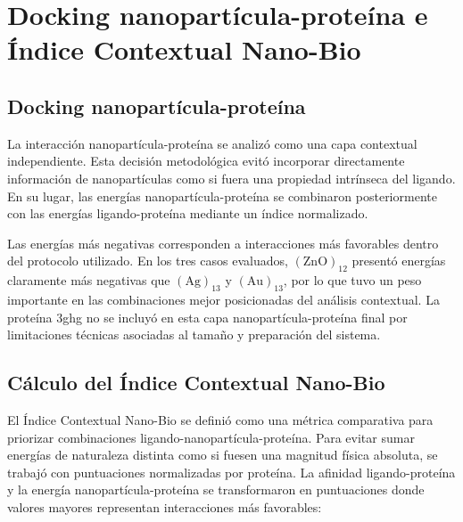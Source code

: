 \documentclass[
  spanish,
  a4paper,
  12pt,
  oneside,
  openany]{memoir}
\newcommand{\apendice}[1]{\chapter{#1}}
\begin{document}
\apendice{Docking nanopartícula-proteína e Índice Contextual Nano-Bio}

\section{Docking nanopartícula-proteína}

La interacción nanopartícula-proteína se analizó como una capa
contextual independiente. Esta decisión metodológica evitó incorporar
directamente información de nanopartículas como si fuera una propiedad
intrínseca del ligando. En su lugar, las energías nanopartícula-proteína
se combinaron posteriormente con las energías ligando-proteína mediante
un índice normalizado.

\begin{table}

\caption{\label{tbl-anexo-nano-proteina-icnb}Energías de docking nanopartícula-proteína utilizadas en la capa contextual.}


\end{table}%

Las energías más negativas corresponden a interacciones más favorables
dentro del protocolo utilizado. En los tres casos evaluados,
\((\mathrm{ZnO})_{12}\) presentó energías claramente más negativas que
\((\mathrm{Ag})_{13}\) y \((\mathrm{Au})_{13}\), por lo que tuvo un peso
importante en las combinaciones mejor posicionadas del análisis
contextual. La proteína 3ghg no se incluyó en esta capa
nanopartícula-proteína final por limitaciones técnicas asociadas al
tamaño y preparación del sistema.

\section{Cálculo del Índice Contextual Nano-Bio}

El Índice Contextual Nano-Bio se definió como una métrica comparativa
para priorizar combinaciones ligando-nanopartícula-proteína. Para evitar
sumar energías de naturaleza distinta como si fuesen una magnitud física
absoluta, se trabajó con puntuaciones normalizadas por proteína. La
afinidad ligando-proteína y la energía nanopartícula-proteína se
transformaron en puntuaciones donde valores mayores representan
interacciones más favorables:
\end{document}
